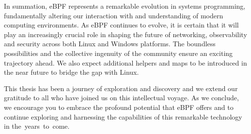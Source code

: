 In summation, eBPF represents a remarkable evolution in systems programming, fundamentally altering our interaction with and understanding of modern computing environments. 
As eBPF continues to evolve, it is certain that it will play an increasingly crucial role in shaping the future of networking, observability and security across both Linux and Windows platforms. 
The boundless possibilities and the collective ingenuity of the community ensure an exciting trajectory ahead.
We also expect additional helpers and maps to be introduced in the near future to bridge the gap with Linux.

This thesis has been a journey of exploration and discovery and we extend our gratitude to all who have joined us on this intellectual voyage. 
As we conclude, we encourage you to embrace the profound potential that eBPF offers and to continue exploring and harnessing the capabilities of this remarkable technology in the years to come.